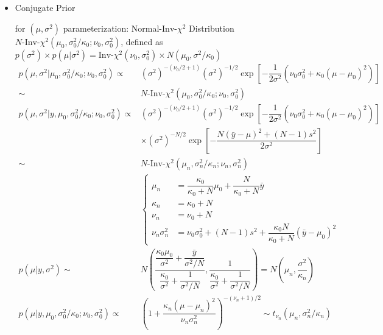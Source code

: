 \begin{itemize}[topsep=2pt,itemsep=0pt]
    \item \hypertarget{NormalConjugate}{Conjugate Prior} for $ (\mu ,\sigma ^2) $ parameterization: Normal-$ \mathrm{ Inv }  $-$ \chi^2 $ Distribution $ N\text{-}\mathrm{ Inv }\text{-}\chi^2(\mu _0, \sigma _0^2/\kappa_0; \nu _0, \sigma _0^2)  $, defined as $p(\sigma ^2)\times p(\mu |\sigma ^2)= \mathrm{ Inv }\text{-}\chi^2(\nu _0,\sigma _0^2)\times N(\mu _0, \sigma ^2/\kappa_0) $
    \begin{align}
        p(\mu ,\sigma ^2|\mu _0, \sigma _0^2/\kappa_0; \nu _0, \sigma _0^2)\propto& (\sigma ^2)^{-(\nu_0/2+1)}(\sigma ^2)^{-1/2}\exp\left[ -\dfrac{ 1 }{ 2\sigma ^2 }(\nu _0\sigma _0^2 + \kappa _0(\mu -\mu _0)^2)  \right]\\
        \sim & N\text{-}\mathrm{ Inv }\text{-}\chi^2(\mu _0, \sigma _0^2/\kappa_0; \nu _0, \sigma _0^2)\\
        p(\mu ,\sigma ^2|y,\mu _0, \sigma _0^2/\kappa_0; \nu _0, \sigma _0^2)\propto& (\sigma ^2)^{-(\nu_0/2+1)}(\sigma ^2)^{-1/2}\exp\left[ -\dfrac{ 1 }{ 2\sigma ^2 }(\nu _0\sigma _0^2 + \kappa _0(\mu -\mu _0)^2)  \right] \\
        &\times (\sigma ^2)^{-N/2}\exp\left[ -\dfrac{ N(\bar{y}-\mu )^2+(N-1)s^2 }{ 2\sigma ^2 }  \right]\\
        \sim&N\text{-}\mathrm{ Inv }\text{-}\chi^2(\mu _n, \sigma _n^2/\kappa _n; \nu _n,\sigma _n^2)\\
        & \begin{cases}
            \mu _n&=\dfrac{ \kappa _0 }{ \kappa _0+N } \mu _0+\dfrac{ N }{ \kappa _0+N } \bar{y}\\
            \kappa _n&=\kappa _0+N\\
            \nu _n&=\nu _0+N\\
            \nu _n\sigma _n^2&=\nu _0\sigma _0^2+(N-1)s^2+\dfrac{ \kappa _0N }{ \kappa _0+N }(\bar{y}-\mu _0)^2 
        \end{cases}\\
        p(\mu |y,\sigma ^2)\sim & N\left( \dfrac{ \dfrac{ \kappa _0\mu _0 }{ \sigma ^2 } + \dfrac{ \bar{y} }{ {\sigma ^2}/N }  }{ \dfrac{ \kappa _0 }{ \sigma ^2 } + \dfrac{ 1 }{ {\sigma ^2}/N } }  ,  \dfrac{ 1  }{ \dfrac{ \kappa _0 }{ \sigma ^2 } + \dfrac{ 1 }{ {\sigma ^2}/N } } \right)=N\left(\mu _n,  \dfrac{ \sigma ^2 }{ \kappa _n }  \right)\\
        p(\mu |y,\mu _0, \sigma _0^2/\kappa_0; \nu _0, \sigma _0^2)\propto& \left(  1+\dfrac{ \kappa _n(\mu -\mu _n)^2 }{ \nu _n\sigma_n^2 }  \right)^{-(\nu _n+1)/2} \sim t_{\nu _n}(\mu _n, \sigma _n^2/\kappa _n)
    \end{align}
    


\end{itemize}
